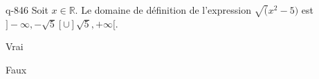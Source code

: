 \begin{truefalse}{q-846}
Soit $x\in \mathbb R$. Le domaine de définition de l'expression $\sqrt(x^2-5)$ est $]-\infty,-\sqrt{5}[\cup ]\sqrt{5},+\infty[$.
\item Vrai
\item* Faux
\end{truefalse}

